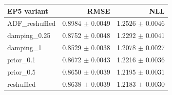 \begin{tabular}{@{}lrr@{}}\toprule
EP5 variant & RMSE & NLL\\\midrule
ADF\_reshuffled & 0.8984 $\pm$ 0.0049 & 1.2526 $\pm$ 0.0046\\
damping\_0.25 & 0.8752 $\pm$ 0.0048 & 1.2292 $\pm$ 0.0041\\
damping\_1 & 0.8529 $\pm$ 0.0038 & 1.2078 $\pm$ 0.0027\\
prior\_0.1 & 0.8672 $\pm$ 0.0043 & 1.2216 $\pm$ 0.0036\\
prior\_0.5 & 0.8650 $\pm$ 0.0039 & 1.2195 $\pm$ 0.0031\\
reshuffled & 0.8638 $\pm$ 0.0039 & 1.2183 $\pm$ 0.0030\\
\bottomrule\end{tabular}
